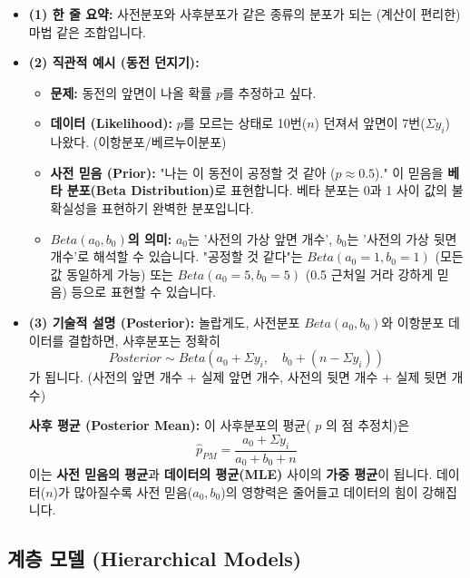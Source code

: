 \documentclass[11pt,a4paper]{book}
\theoremstyle{definition}
\begin{document}
\begin{itemize}
    \item \textbf{(1) 한 줄 요약:} 사전분포와 사후분포가 같은 종류의 분포가 되는 (계산이 편리한) 마법 같은 조합입니다.
    \item \textbf{(2) 직관적 예시 (동전 던지기):}
    \begin{itemize}
        \item \textbf{문제:} 동전의 앞면이 나올 확률 $p$를 추정하고 싶다.
        \item \textbf{데이터 (Likelihood):} $p$를 모르는 상태로 10번($n$) 던져서 앞면이 7번($\Sigma y_i$) 나왔다. (이항분포/베르누이분포)
        \item \textbf{사전 믿음 (Prior):} "나는 이 동전이 공정할 것 같아 ($p \approx 0.5$)." 이 믿음을 \textbf{베타 분포(Beta Distribution)}로 표현합니다. 베타 분포는 0과 1 사이 값의 불확실성을 표현하기 완벽한 분포입니다.
        \item \textbf{$Beta(a_0, b_0)$의 의미:} $a_0$는 '사전의 가상 앞면 개수', $b_0$는 '사전의 가상 뒷면 개수'로 해석할 수 있습니다. "공정할 것 같다"는 $Beta(a_0=1, b_0=1)$ (모든 값 동일하게 가능) 또는 $Beta(a_0=5, b_0=5)$ (0.5 근처일 거라 강하게 믿음) 등으로 표현할 수 있습니다.
    \end{itemize}
    \item \textbf{(3) 기술적 설명 (Posterior):}
    놀랍게도, 사전분포 $Beta(a_0, b_0)$와 이항분포 데이터를 결합하면, 사후분포는 정확히
    $$ Posterior \sim Beta(a_0 + \Sigma y_i, \quad b_0 + (n - \Sigma y_i)) $$
    가 됩니다. (사전의 앞면 개수 + 실제 앞면 개수, 사전의 뒷면 개수 + 실제 뒷면 개수)
    
    \textbf{사후 평균 (Posterior Mean):} 이 사후분포의 평균( $p$ 의 점 추정치)은
    $$ \hat{p}_{PM} = \frac{a_0 + \Sigma y_i}{a_0 + b_0 + n} $$
    이는 \textbf{사전 믿음의 평균}과 \textbf{데이터의 평균(MLE)} 사이의 \textbf{가중 평균}이 됩니다. 데이터($n$)가 많아질수록 사전 믿음($a_0, b_0$)의 영향력은 줄어들고 데이터의 힘이 강해집니다.
\end{itemize}

\subsection{계층 모델 (Hierarchical Models)}
\end{document}
